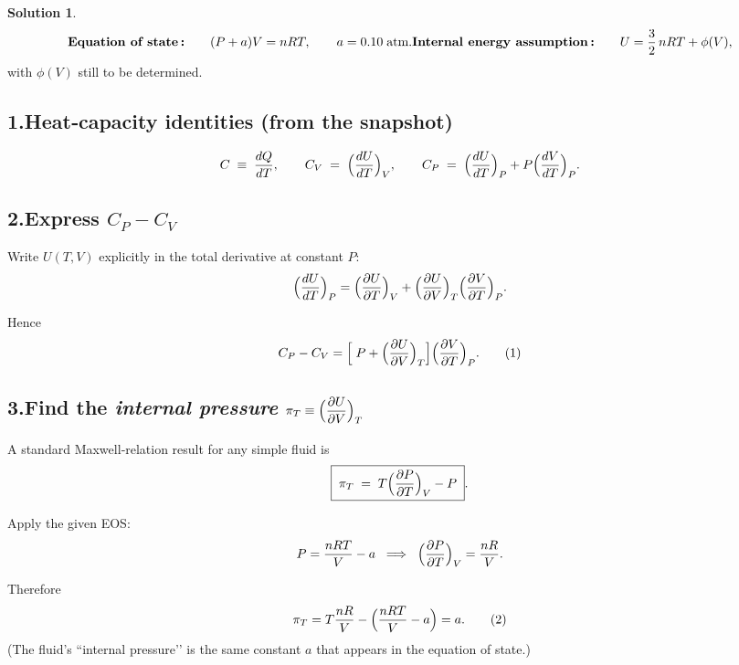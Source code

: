 \documentclass[12pt]{article}
\theoremstyle{definition} %
\newtheorem{solution}{Solution}
\theoremstyle{plain} %
\begin{document}
  \begin{solution}
    \[
    \textbf{Equation of state\,:}\qquad
    (P+a)V = nRT,\qquad a=0.10\;\text{atm}. \\[4pt]
    \textbf{Internal energy assumption\,:}\qquad
    \displaystyle U = \frac{3}{2}\,nRT + \phi(V), 
    \]
    with $\phi(V)$ still to be determined.
    
    \subsection*{1.\;Heat‑capacity identities (from the snapshot)}
    \[
    C \;\equiv\; \frac{dQ}{dT},\qquad
    C_V \;=\;\Bigl(\frac{dU}{dT}\Bigr)_{V},\qquad
    C_P \;=\;\Bigl(\frac{dU}{dT}\Bigr)_{P} + P\Bigl(\frac{dV}{dT}\Bigr)_{P}.
    \]
    
    \subsection*{2.\;Express $C_P-C_V$ }
    Write $U(T,V)$ explicitly in the total derivative at constant $P$:
    \[
    \Bigl(\frac{dU}{dT}\Bigr)_{P}
       =\Bigl(\frac{\partial U}{\partial T}\Bigr)_{V}
       +\Bigl(\frac{\partial U}{\partial V}\Bigr)_{T}
        \Bigl(\frac{\partial V}{\partial T}\Bigr)_{P}.
    \]
    
    Hence
    \[
    C_P-C_V
      =\Bigl[\;P+\Bigl(\frac{\partial U}{\partial V}\Bigr)_{T}\Bigr]
        \Bigl(\frac{\partial V}{\partial T}\Bigr)_{P}.
    \tag{1}
    \]
    
    \subsection*{3.\;Find the \emph{internal pressure} $\displaystyle
    \pi_T\equiv\Bigl(\frac{\partial U}{\partial V}\Bigr)_{T}$}
    
    A standard Maxwell‑relation result for any simple fluid is
    \[
    \boxed{\;
    \pi_T
       \;=\;
       T\Bigl(\frac{\partial P}{\partial T}\Bigr)_{V} - P
    \;} .
    \]
    
    Apply the given EOS:
    \[
    P = \frac{nRT}{V} - a
          \;\;\Longrightarrow\;\;
    \Bigl(\frac{\partial P}{\partial T}\Bigr)_{V} = \frac{nR}{V}.
    \]
    
    Therefore
    \[
    \pi_T
      = T\frac{nR}{V} -\Bigl(\frac{nRT}{V}-a\Bigr)
      = a.   \tag{2}
    \]
    (The fluid’s “internal pressure’’ is the same constant $a$ that appears in the equation of state.)
    

\end{solution}
\end{document}
